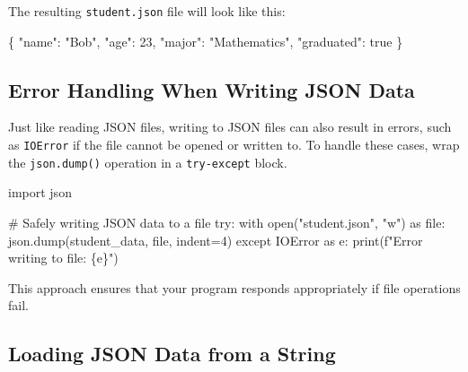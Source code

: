 \documentclass[
  letterpaper,
  DIV=11,
  numbers=noendperiod]{scrreprt}
\newenvironment{Shaded}{\begin{snugshade}}{\end{snugshade}}
\newcommand{\BuiltInTok}[1]{\textcolor[rgb]{0.00,0.23,0.31}{#1}}
\newcommand{\CommentTok}[1]{\textcolor[rgb]{0.37,0.37,0.37}{#1}}
\newcommand{\ControlFlowTok}[1]{\textcolor[rgb]{0.00,0.23,0.31}{#1}}
\newcommand{\DataTypeTok}[1]{\textcolor[rgb]{0.68,0.00,0.00}{#1}}
\newcommand{\DecValTok}[1]{\textcolor[rgb]{0.68,0.00,0.00}{#1}}
\newcommand{\FunctionTok}[1]{\textcolor[rgb]{0.28,0.35,0.67}{#1}}
\newcommand{\ImportTok}[1]{\textcolor[rgb]{0.00,0.46,0.62}{#1}}
\newcommand{\KeywordTok}[1]{\textcolor[rgb]{0.00,0.23,0.31}{#1}}
\newcommand{\NormalTok}[1]{\textcolor[rgb]{0.00,0.23,0.31}{#1}}
\newcommand{\OperatorTok}[1]{\textcolor[rgb]{0.37,0.37,0.37}{#1}}
\newcommand{\PreprocessorTok}[1]{\textcolor[rgb]{0.68,0.00,0.00}{#1}}
\newcommand{\SpecialCharTok}[1]{\textcolor[rgb]{0.37,0.37,0.37}{#1}}
\newcommand{\SpecialStringTok}[1]{\textcolor[rgb]{0.13,0.47,0.30}{#1}}
\newcommand{\StringTok}[1]{\textcolor[rgb]{0.13,0.47,0.30}{#1}}
\begin{document}
The resulting \texttt{student.json} file will look like this:

\begin{Shaded}
\begin{Highlighting}[]
\FunctionTok{\{}
    \DataTypeTok{"name"}\FunctionTok{:} \StringTok{"Bob"}\FunctionTok{,}
    \DataTypeTok{"age"}\FunctionTok{:} \DecValTok{23}\FunctionTok{,}
    \DataTypeTok{"major"}\FunctionTok{:} \StringTok{"Mathematics"}\FunctionTok{,}
    \DataTypeTok{"graduated"}\FunctionTok{:} \KeywordTok{true}
\FunctionTok{\}}
\end{Highlighting}
\end{Shaded}

\hypertarget{error-handling-when-writing-json-data}{%
\subsection{Error Handling When Writing JSON
Data}\label{error-handling-when-writing-json-data}}

Just like reading JSON files, writing to JSON files can also result in
errors, such as \texttt{IOError} if the file cannot be opened or written
to. To handle these cases, wrap the \texttt{json.dump()} operation in a
\texttt{try-except} block.

\begin{Shaded}
\begin{Highlighting}[]
\ImportTok{import}\NormalTok{ json}

\CommentTok{\# Safely writing JSON data to a file}
\ControlFlowTok{try}\NormalTok{:}
    \ControlFlowTok{with} \BuiltInTok{open}\NormalTok{(}\StringTok{"student.json"}\NormalTok{, }\StringTok{"w"}\NormalTok{) }\ImportTok{as} \BuiltInTok{file}\NormalTok{:}
\NormalTok{        json.dump(student\_data, }\BuiltInTok{file}\NormalTok{, indent}\OperatorTok{=}\DecValTok{4}\NormalTok{)}
\ControlFlowTok{except} \PreprocessorTok{IOError} \ImportTok{as}\NormalTok{ e:}
    \BuiltInTok{print}\NormalTok{(}\SpecialStringTok{f"Error writing to file: }\SpecialCharTok{\{}\NormalTok{e}\SpecialCharTok{\}}\SpecialStringTok{"}\NormalTok{)}
\end{Highlighting}
\end{Shaded}

This approach ensures that your program responds appropriately if file
operations fail.

\hypertarget{loading-json-data-from-a-string}{%
\subsection{Loading JSON Data from a
String}\label{loading-json-data-from-a-string}}
\end{document}
